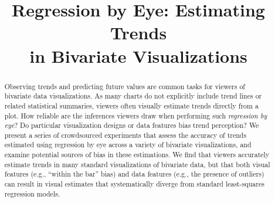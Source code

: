 \documentclass{sigchi}
\def\plaintitle{Regression by Eye: Estimating Trends\\in Bivariate Visualizations}
\begin{document}
\title{\plaintitle}

\author{%
}

\maketitle

\begin{abstract}
Observing trends and predicting future values are common tasks for viewers of bivariate data visualizations. As many charts do not explicitly include trend lines or related statistical summaries, viewers often visually estimate trends directly from a plot. How reliable are the inferences viewers draw when performing such \emph{regression by eye}? Do particular visualization designs or data features bias trend perception? We present a series of crowdsourced experiments that assess the accuracy of trends estimated using regression by eye across a variety of bivariate visualizations, and examine potential sources of bias in these estimations. We find that viewers accurately estimate trends in many standard visualizations of bivariate data, but that both visual features (e.g., ``within the bar'' bias) and data features (e.g., the presence of outliers) can result in visual estimates that systematically diverge from standard least-squares regression models.
\end{abstract}

\end{document}

